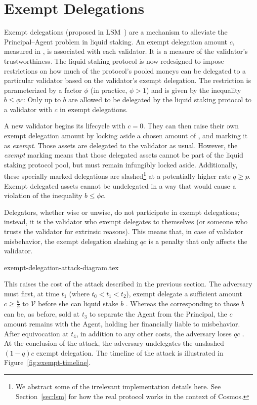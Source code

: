 \section{Exempt Delegations}

Exempt delegations (proposed in LSM~\cite{liquidity-staking-module})
are a mechanism to alleviate the Principal--Agent problem in liquid staking.
An exempt delegation amount $c$, measured in \asset, is associated
with each validator. It is a measure of the validator's trustworthiness.
The liquid staking protocol is now redesigned to impose restrictions
on how much of the protocol's pooled moneys can be delegated to a particular
validator based on the validator's exempt delegation.
The restriction is
parameterized by a factor $\phi$ (in practice, $\phi > 1$)
and is given by the inequality $b \leq \phi c$: Only up to $b$ \assets
are allowed to be delegated by the liquid staking protocol
to a validator with $c$ \assets in exempt delegations.

A new validator begins its lifecycle with $c = 0$. They can then
raise their own exempt delegation amount by locking aside a
chosen amount of \asset, and marking it as \emph{exempt}. Those
assets are delegated to the validator as usual. However,
the \emph{exempt}
marking means that those delegated assets cannot be part of the liquid
staking protocol pool, but must remain infungibly locked aside. Additionally,
these specially marked delegations are slashed\footnote{We abstract some
of the irrelevant implementation details here. See Section~\ref{sec:lsm}
for how the real protocol works in the context of Cosmos.}
at a potentially higher rate $q \geq p$. Exempt delegated assets cannot
be undelegated in a way that would cause a violation of the inequality
$b \leq \phi c$.

Delegators, whether wise or unwise, do not participate in exempt
delegations; instead, it is the validator who exempt delegates to
themselves (or someone who trusts the validator for extrinsic reasons).
This means that, in case of validator misbehavior, the exempt delegation
slashing $qc$ is a penalty that only affects the validator.

{exempt-delegation-attack-diagram.tex}

This raises
the cost of the attack described in the previous section. The
adversary must first, at time $t_1$ (where $t_0 < t_1 < t_2$), exempt delegate a sufficient amount
$c \geq \frac{b}{\phi}$ \asset to $\mathcal{V}$ before she can liquid stake $b$ \asset.
Whereas the \stassets
corresponding to those $b$ \assets can be, as before, sold at $t_3$ to
separate the Agent from the Principal, the $c$ amount remains with the
Agent, holding her financially liable to misbehavior. After equivocation at $t_4$,
in addition to any other costs, the adversary loses $qc$ \asset. At the conclusion
of the attack, the adversary undelegates the unslashed $(1 - q)c$ exempt delegation.
The timeline of the attack is illustrated in Figure~\ref{fig:exempt-timeline}.

